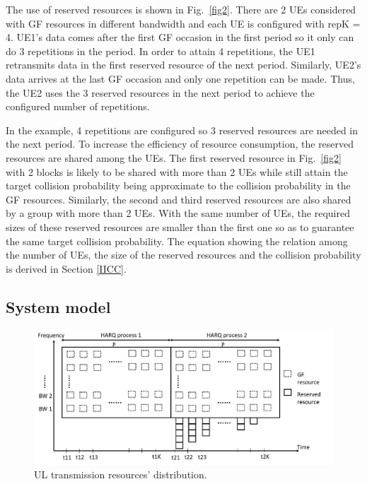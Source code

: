\documentclass[conference]{IEEEtran}
\begin{document}
The use of reserved resources is shown in Fig.~\ref{fig2}. There are 2 UEs considered with GF resources in different bandwidth and each UE is configured with repK = 4. UE1's data comes after the first GF occasion in the first period so it only can do 3 repetitions in the period. In order to attain 4 repetitions, the UE1 retransmits data in the first reserved resource of the next period. Similarly, UE2's data arrives at the last GF occasion and only one repetition can be made. Thus, the UE2 uses the 3 reserved resources in the next period to achieve the configured number of repetitions.

In the example, 4 repetitions are configured so 3 reserved resources are needed in the next period. To increase the efficiency of resource consumption, the reserved resources are shared among the UEs. The first reserved resource in Fig.~\ref{fig2} with 2 blocks is likely to be shared with more than 2 UEs while still attain the target collision probability being approximate to the collision probability in the GF resources. Similarly, the second and third reserved resources are also shared by a group with more than 2 UEs. With the same number of UEs, the required sizes of these reserved resources are smaller than the first one so as to guarantee the same target collision probability. The equation showing the relation among the number of UEs, the size of the reserved resources and the collision probability is derived in Section \ref{IICC}.

\subsection{System model}\label{IIBB}

\begin{figure}[htbp]
\centerline{\includegraphics[scale=0.25]{fig3.png}}
\caption{UL transmission resources' distribution.}
\label{fig3}
\end{figure}
\end{document}
